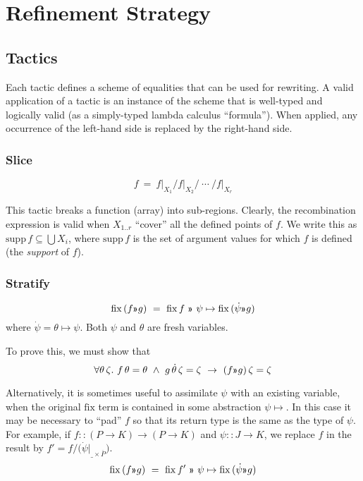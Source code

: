 \documentclass{article}
\newcommand\newterm[1]{{\it #1}}
\newcommand\limplies{\rightarrow}
\begin{document}
\section{Refinement Strategy}

\subsection{Tactics}

Each tactic defines a scheme of equalities that can be used for rewriting.
A valid application of a tactic is an instance of the scheme that is well-typed and logically valid
(as a simply-typed lambda calculus ``formula'').
When applied, any occurrence of the left-hand side is replaced by the right-hand side.

\subsubsection{Slice}
\[f ~=~ f\big|_{X_1} \Big/ f\big|_{X_2} \Big/ ~\cdots~ \Big/ f\big|_{X_r}\]

This tactic breaks a function (array) into sub-regions. Clearly, the recombination expression is
valid when $X_{1..r}$ ``cover'' all the defined points of $f$. We write this as 
$\mathrm{supp}\,f \subseteq \bigcup X_i$, where $\mathrm{supp}\,f$ is the set of
argument values for which $f$ is defined (the \newterm{support} of $f$).

\subsubsection{Stratify}

\[\mathrm{fix}\,(f\applt g) ~=~ \mathrm{fix}\,f ~\applt~ \psi\mapsto \mathrm{fix}\,(\dot\psi\applt g)\]
%
where $\dot\psi=\theta\mapsto\psi$. Both $\psi$ and $\theta$ are fresh variables.

\medskip
To prove this, we must show that
\[\forall \theta\,\zeta.~ f\,\theta=\theta ~\land~ g\,\dot\theta\,\zeta=\zeta ~\limplies~
          (f\applt g)\,\zeta = \zeta\]

\medskip
Alternatively, it is sometimes useful to assimilate $\psi$ with an existing variable,
when the original $\mathrm{fix}$ term is contained in some abstraction $\psi\mapsto$.
In this case it may be necessary to ``pad'' $f$ so that its return type is the same as
the type of $\psi$. For example, if $f::(P\to K)\to(P\to K)$ and $\psi::J\to K$,
we replace $f$ in the result by $f' = f\big/\big(\dot\psi\big|_{\_\times \overline{P}}\big)$.
%
\[\mathrm{fix}\,(f\applt g) ~=~ \mathrm{fix}\,f' ~\applt~ \psi\mapsto \mathrm{fix}\,(\dot\psi\applt g)\]
\end{document}
